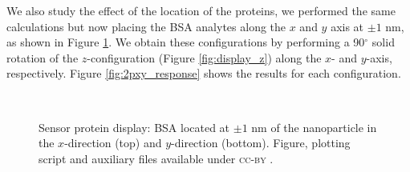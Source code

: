 We also study the effect of the location of the proteins, we performed the same 
calculations but now placing the BSA analytes along the $x$ and $y$ axis at $\pm 1$ nm,
as shown in Figure \ref{fig:display_xy}. We obtain these configurations by performing
a 90$^\circ$ solid rotation of the $z$-configuration (Figure \ref{fig:display_z})
along the $x$- and $y$-axis, respectively. Figure \ref{fig:2pxy_response} shows the 
results for each configuration.

 \begin{figure}
    \centering
     \\
     \caption{Sensor protein display: BSA located at $\pm 1$ nm of the nanoparticle in the
            $x$-direction (top) and $y$-direction (bottom). Figure, plotting script and 
            auxiliary files available under \textsc{cc-by} \cite{ClementiETal2018e}.}
     \label{fig:display_xy}
 \end{figure}

